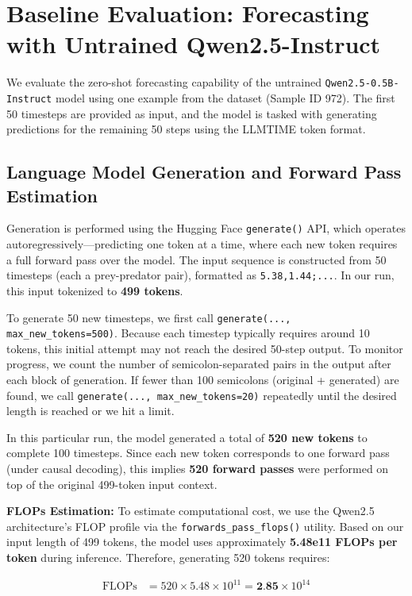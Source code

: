 \documentclass[a4paper,12pt]{article}
\begin{document}
  \section{Baseline Evaluation: Forecasting with Untrained Qwen2.5-Instruct}

  We evaluate the zero-shot forecasting capability of the untrained \texttt{Qwen2.5-0.5B-Instruct} model using one example from the dataset (Sample ID 972). The first 50 timesteps are provided as input, and the model is tasked with generating predictions for the remaining 50 steps using the LLMTIME token format.
  
  \subsection*{Language Model Generation and Forward Pass Estimation}
  
  Generation is performed using the Hugging Face \texttt{generate()} API, which operates autoregressively—predicting one token at a time, where each new token requires a full forward pass over the model. The input sequence is constructed from 50 timesteps (each a prey-predator pair), formatted as \texttt{5.38,1.44;...}. In our run, this input tokenized to \textbf{499 tokens}.
  
  To generate 50 new timesteps, we first call \texttt{generate(..., max\_new\_tokens=500)}. Because each timestep typically requires around 10 tokens, this initial attempt may not reach the desired 50-step output. To monitor progress, we count the number of semicolon-separated pairs in the output after each block of generation. If fewer than 100 semicolons (original + generated) are found, we call \texttt{generate(..., max\_new\_tokens=20)} repeatedly until the desired length is reached or we hit a limit.
  
  In this particular run, the model generated a total of \textbf{520 new tokens} to complete 100 timesteps. Since each new token corresponds to one forward pass (under causal decoding), this implies \textbf{520 forward passes} were performed on top of the original 499-token input context.
  
  \textbf{FLOPs Estimation:} To estimate computational cost, we use the Qwen2.5 architecture’s FLOP profile via the \texttt{forwards\_pass\_flops()} utility. Based on our input length of 499 tokens, the model uses approximately \textbf{5.48e11 FLOPs per token} during inference. Therefore, generating 520 tokens requires:
  
  \begin{align*}
  \text{FLOPs} &= 520 \times 5.48 \times 10^{11} = \textbf{2.85} \times 10^{14}
  \end{align*}
  
\end{document}
